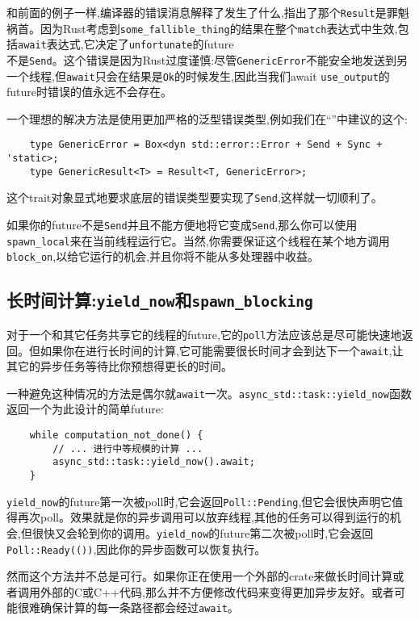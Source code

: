 和前面的例子一样,编译器的错误消息解释了发生了什么,指出了那个\texttt{Result}是罪魁祸首。因为Rust考虑到\texttt{some\_fallible\_thing}的结果在整个\texttt{match}表达式中生效,包括\texttt{await}表达式,它决定了\texttt{unfortunate}的future\\
不是\texttt{Send}。这个错误是因为Rust过度谨慎:尽管\texttt{GenericError}不能安全地发送到另一个线程,但\texttt{await}只会在结果是\texttt{Ok}的时候发生,因此当我们await \texttt{use\_output}的future时错误的值永远不会存在。

一个理想的解决方法是使用更加严格的泛型错误类型,例如我们在“”中建议的这个:
\begin{verbatim}
    type GenericError = Box<dyn std::error::Error + Send + Sync + 'static>;
    type GenericResult<T> = Result<T, GenericError>;
\end{verbatim}

这个trait对象显式地要求底层的错误类型要实现了\texttt{Send},这样就一切顺利了。

如果你的future不是\texttt{Send}并且不能方便地将它变成\texttt{Send},那么你可以使用\texttt{spawn\_local}来在当前线程运行它。当然,你需要保证这个线程在某个地方调用\texttt{block\_on},以给它运行的机会,并且你将不能从多处理器中收益。

\subsection{长时间计算:\texttt{yield\_now}和\texttt{spawn\_blocking}}\label{LongCompute}

对于一个和其它任务共享它的线程的future,它的\texttt{poll}方法应该总是尽可能快速地返回。但如果你在进行长时间的计算,它可能需要很长时间才会到达下一个\texttt{await},让其它的异步任务等待比你预想得更长的时间。

一种避免这种情况的方法是偶尔就\texttt{await}一次。\texttt{async\_std::task::yield\_now}函数返回一个为此设计的简单future:
\begin{verbatim}
    while computation_not_done() {
        // ... 进行中等规模的计算 ...
        async_std::task::yield_now().await;
    }
\end{verbatim}

\texttt{yield\_now}的future第一次被poll时,它会返回\texttt{Poll::Pending},但它会很快声明它值得再次poll。效果就是你的异步调用可以放弃线程,其他的任务可以得到运行的机会,但很快又会轮到你的调用。\texttt{yield\_now}的future第二次被poll时,它会返回\texttt{Poll::Ready(())},因此你的异步函数可以恢复执行。

然而这个方法并不总是可行。如果你正在使用一个外部的crate来做长时间计算或者调用外部的C或C++代码,那么并不方便修改代码来变得更加异步友好。或者可能很难确保计算的每一条路径都会经过\texttt{await}。

